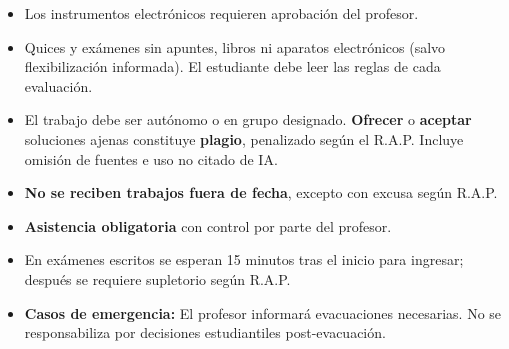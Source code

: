 \begin{itemize}
\item Los instrumentos electrónicos requieren aprobación del profesor.

\item Quices y exámenes sin apuntes, libros ni aparatos electrónicos (salvo flexibilización informada). El estudiante debe leer las reglas de cada evaluación.

\item El trabajo debe ser autónomo o en grupo designado. \textbf{Ofrecer} o \textbf{aceptar} soluciones ajenas constituye \textbf{plagio}, penalizado según el R.A.P. Incluye omisión de fuentes e uso no citado de IA.

\item \textbf{No se reciben trabajos fuera de fecha}, excepto con excusa según R.A.P.

\item \textbf{Asistencia obligatoria} con control por parte del profesor.

\item En exámenes escritos se esperan 15 minutos tras el inicio para ingresar; después se requiere supletorio según R.A.P.

\item \textbf{Casos de emergencia:} El profesor informará evacuaciones necesarias. No se responsabiliza por decisiones estudiantiles post-evacuación.
\end{itemize}
